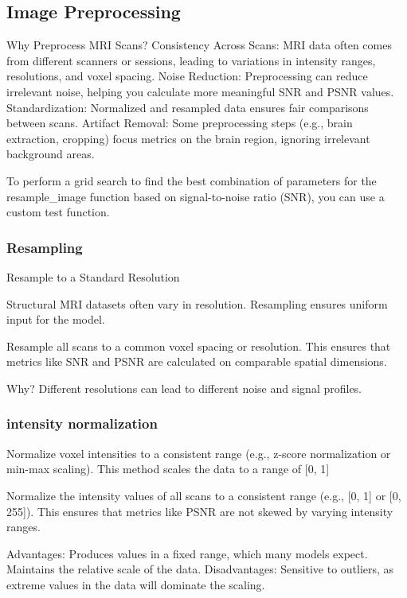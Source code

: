 %
\subsection{Image Preprocessing}

Why Preprocess MRI Scans?
Consistency Across Scans: MRI data often comes from different scanners or sessions, leading to variations in intensity ranges, resolutions, and voxel spacing.
Noise Reduction: Preprocessing can reduce irrelevant noise, helping you calculate more meaningful SNR and PSNR values.
Standardization: Normalized and resampled data ensures fair comparisons between scans.
Artifact Removal: Some preprocessing steps (e.g., brain extraction, cropping) focus metrics on the brain region, ignoring irrelevant background areas.

To perform a grid search to find the best combination of parameters for the resample_image function based on signal-to-noise ratio (SNR), you can use a custom test function.

\subsubsection{Resampling}
Resample to a Standard Resolution

Structural MRI datasets often vary in resolution. Resampling ensures uniform input for the model.

Resample all scans to a common voxel spacing or resolution. This ensures that metrics like SNR and PSNR are calculated on comparable spatial dimensions.

Why? Different resolutions can lead to different noise and signal profiles.

\subsubsection{intensity normalization}

Normalize voxel intensities to a consistent range (e.g., z-score normalization or min-max scaling).
This method scales the data to a range of [0, 1]

Normalize the intensity values of all scans to a consistent range (e.g., [0, 1] or [0, 255]). This ensures that metrics like PSNR are not skewed by varying intensity ranges.

Advantages:
Produces values in a fixed range, which many models expect.
Maintains the relative scale of the data.
Disadvantages:
Sensitive to outliers, as extreme values in the data will dominate the scaling.

